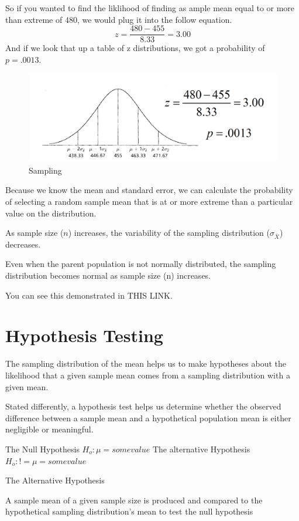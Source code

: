 \documentclass[]{book}
\theoremstyle{definition}
\theoremstyle{definition}
\theoremstyle{definition}
\theoremstyle{remark}
\begin{document}
So if you wanted to find the liklihood of finding as ample mean equal to
or more than extreme of 480, we would plug it into the follow equation.
\[z = \frac{480 - 455}{8.33} = 3.00\] And if we look that up a table of
z distributions, we got a probability of \(p=.0013\).

\begin{figure}
\centering
\includegraphics{img/hickssampling3.png}
\caption{Sampling}
\end{figure}

Because we know the mean and standard error, we can calculate the
probability of selecting a random sample mean that is at or more extreme
than a particular value on the distribution.

As sample size (\(n\)) increases, the variability of the sampling
distribution (\(\sigma_\bar{X}\)) decreases.

Even when the parent population is not normally distributed, the
sampling distribution becomes normal as sample size (n) increases.

You can see this demonstrated in THIS LINK.

\chapter{Hypothesis Testing}\label{hypothesis-testing}

The sampling distribution of the mean helps us to make hypotheses about
the likelihood that a given sample mean comes from a sampling
distribution with a given mean.

Stated differently, a hypothesis test helps us determine whether the
observed difference between a sample mean and a hypothetical population
mean is either negligible or meaningful.

The Null Hypothesis \(H_o : \mu = some value\) The alternative
Hypothesis \(H_o : != \mu = some value\)

The Alternative Hypothesis

A sample mean of a given sample size is produced and compared to the
hypothetical sampling distribution's mean to test the null hypothesis
\end{document}
